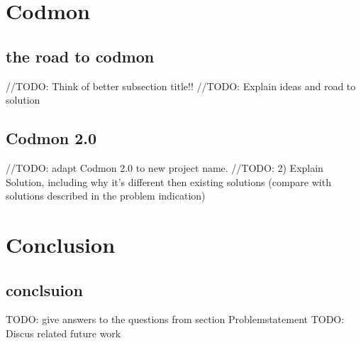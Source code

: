 \documentclass[a4paper,10pt]{scrartcl}
\begin{document}
\newpage

\section{Codmon}
\label{sec:codmon}

\subsection{the road to codmon}
//TODO: Think of better subsection title!!
//TODO: Explain ideas and road to solution

\subsection{Codmon 2.0}
//TODO: adapt Codmon 2.0 to new project name.
//TODO: 2) Explain Solution, including why it's different then existing solutions (compare with solutions described in the problem indication)

\newpage
\section{Conclusion}
\subsection{conclsuion}
TODO: give answers to the questions from section Problemstatement
TODO: Discus related future work
\newpage


\end{document}
